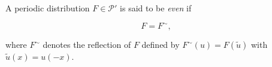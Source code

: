 A periodic distribution $F \in \mathcal{P}'$ is said to be \textit{even} if

$$F = F^\sim,$$

where $F^\sim$ denotes the reflection of $F$ defined by $F^\sim(u) = F(\tilde{u})$ with $\tilde{u}(x) = u(-x)$.
